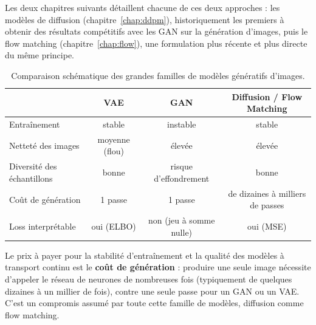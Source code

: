 Les deux chapitres suivants détaillent chacune de ces deux approches : les modèles de diffusion
(chapitre~\ref{chap:ddpm}), historiquement les premiers à obtenir des résultats compétitifs avec les
GAN sur la génération d'images, puis le flow matching (chapitre~\ref{chap:flow}), une formulation plus
récente et plus directe du même principe.

\begin{table}[h]
\centering
\begin{tabular}{@{}lccc@{}}
\toprule
& \textbf{VAE} & \textbf{GAN} & \textbf{Diffusion / Flow Matching} \\
\midrule
Entraînement & stable & instable & stable \\
Netteté des images & moyenne (flou) & élevée & élevée \\
Diversité des échantillons & bonne & risque d'effondrement & bonne \\
Coût de génération & 1 passe & 1 passe & de dizaines à milliers de passes \\
Loss interprétable & oui (ELBO) & non (jeu à somme nulle) & oui (MSE) \\
\bottomrule
\end{tabular}
\caption{Comparaison schématique des grandes familles de modèles génératifs d'images.}
\end{table}

Le prix à payer pour la stabilité d'entraînement et la qualité des modèles à transport continu est le
\textbf{coût de génération} : produire une seule image nécessite d'appeler le réseau de neurones de
nombreuses fois (typiquement de quelques dizaines à un millier de fois), contre une seule passe pour un
GAN ou un VAE. C'est un compromis assumé par toute cette famille de modèles, diffusion comme flow
matching.
